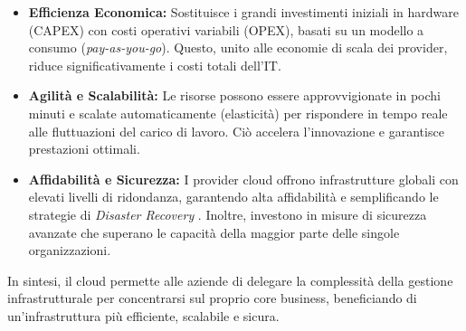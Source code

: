 \begin{itemize}
    \item \textbf{Efficienza Economica:} Sostituisce i grandi investimenti iniziali in hardware (CAPEX) con costi operativi variabili (OPEX), basati su un modello a consumo (\textit{pay-as-you-go}). Questo, unito alle economie di scala dei provider, riduce significativamente i costi totali dell'IT.
    \item \textbf{Agilità e Scalabilità:} Le risorse possono essere approvvigionate in pochi minuti e scalate automaticamente (elasticità) per rispondere in tempo reale alle fluttuazioni del carico di lavoro. Ciò accelera l'innovazione e garantisce prestazioni ottimali.
    \item \textbf{Affidabilità e Sicurezza:} I provider cloud offrono infrastrutture globali con elevati livelli di ridondanza, garantendo alta affidabilità e semplificando le strategie di \textit{Disaster Recovery} . Inoltre, investono in misure di sicurezza avanzate che superano le capacità della maggior parte delle singole organizzazioni.
\end{itemize}

In sintesi, il cloud permette alle aziende di delegare la complessità della gestione infrastrutturale per concentrarsi sul proprio core business, beneficiando di un'infrastruttura più efficiente, scalabile e sicura.









